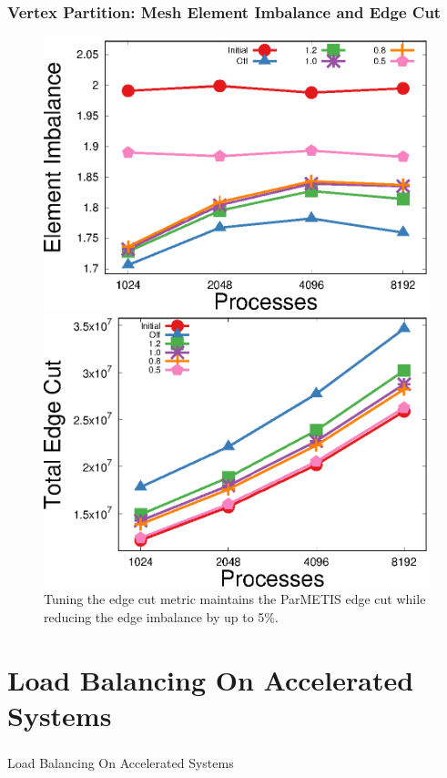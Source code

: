 \documentclass[aspectratio=169]{beamer}
\begin{document}
\begin{frame}
  \frametitle{Vertex Partition: Mesh Element Imbalance and Edge Cut}
  \begin{figure}
    \centering
    \includegraphics[width=.48\textwidth]{../accelerated_cse19/figures/eimb_v_cores.eps}
    \includegraphics[width=.48\textwidth]{../accelerated_cse19/figures/ecut_v_cores.eps}\\
    Tuning the edge cut metric maintains the ParMETIS edge cut while reducing the
    edge imbalance by up to 5\%.
  \end{figure}
\end{frame}

\section{Load Balancing On Accelerated Systems}

\begin{frame}
  \frametitle{}
  \center \huge{Load Balancing On Accelerated Systems}
\end{frame}
\end{document}
